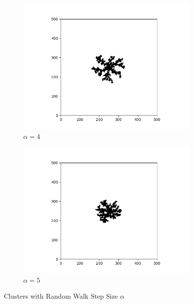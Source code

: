 \documentclass[aps,preprint,groupedaddress,letterpaper]{revtex4-1}
\begin{document}
\begin{figure}[h]
\begin{subfigure}[h]{0.23\textwidth}
         \includegraphics[width=\textwidth]{img/alpha/4.png}
         \caption{$\alpha = 4$}
         \label{al7}
     \end{subfigure}
     \hfill
     \begin{subfigure}[h]{0.23\textwidth}
         \centering
         \includegraphics[width=\textwidth]{img/alpha/5.png}
         \caption{$\alpha = 5$}
         \label{al9}
     \end{subfigure}
        \caption{Clusters with Random Walk Step Size $\alpha$}
        \label{alpha}
\end{figure}
\end{document}
